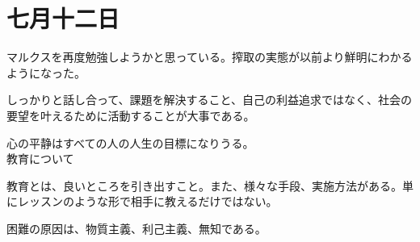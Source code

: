 \chapter{七月十二日}

マルクスを再度勉強しようかと思っている。搾取の実態が以前より鮮明にわかるようになった。

しっかりと話し合って、課題を解決すること、自己の利益追求ではなく、社会の要望を叶えるために活動することが大事である。

心の平静はすべての人の人生の目標になりうる。
\\

教育について

教育とは、良いところを引き出すこと。また、様々な手段、実施方法がある。単にレッスンのような形で相手に教えるだけではない。

困難の原因は、物質主義、利己主義、無知である。


